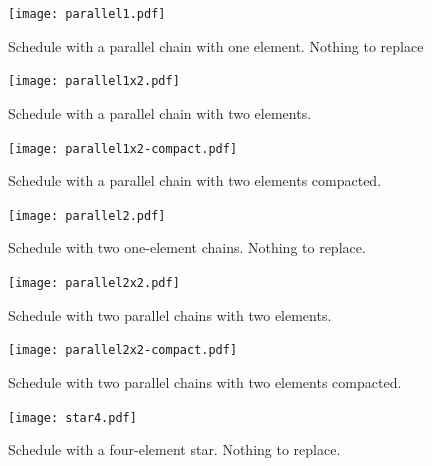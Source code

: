 \documentclass[12pt,a4paper]{report}
\begin{document}
    \begin{figure}
        \centering
        \texttt{[image: parallel1.pdf]}
        \caption{Schedule with a parallel chain with one element. Nothing to replace}
        \label{fig:parallel1}
    \end{figure}
    \begin{figure}
        \centering
        \texttt{[image: parallel1x2.pdf]}
        \caption{Schedule with a parallel chain with two elements.}
        \label{fig:parallel1x2}
    \end{figure}
    \begin{figure}
        \centering
        \texttt{[image: parallel1x2-compact.pdf]}
        \caption{Schedule with a parallel chain with two elements compacted.}
        \label{fig:parallel1x2-compact}
    \end{figure}
    \begin{figure}
        \centering
        \texttt{[image: parallel2.pdf]}
        \caption{Schedule with two one-element chains. Nothing to replace.}
        \label{fig:parallel2}
    \end{figure}
    \begin{figure}
        \centering
        \texttt{[image: parallel2x2.pdf]}
        \caption{Schedule with two parallel chains with two elements.}
        \label{fig:parallel2x2}
    \end{figure}
    \begin{figure}
        \centering
        \texttt{[image: parallel2x2-compact.pdf]}
        \caption{Schedule with two parallel chains with two elements compacted.}
        \label{fig:parallel2x2-compact}
    \end{figure}
    \begin{figure}
        \centering
        \texttt{[image: star4.pdf]}
        \caption{Schedule with a four-element star. Nothing to replace.}
        \label{fig:star4}
    \end{figure}
\end{document}
